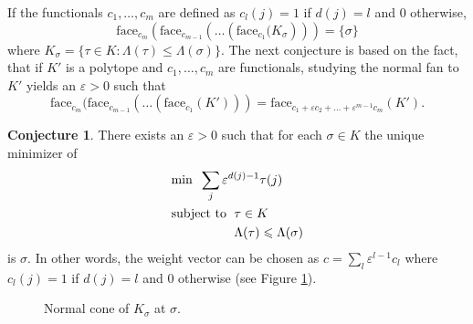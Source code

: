 \documentclass{article}
\theoremstyle{definition}
\newtheorem{conjecture}[theorem]{Conjecture}
\theoremstyle{remark}
\renewcommand{\leq}{\leqslant}
\renewcommand{\epsilon}{\varepsilon}
\newcommand{\face}{\text{face}}
\begin{document}
If the functionals $c_1,\dots,c_m$ are defined as $c_l(j)=1$ if $d(j)=l$ and $0$ otherwise,
$$ \face_{c_m}\left(\face_{c_{m-1}}\left(\dots \left(\face_{c_1}(K_\sigma\right)\right)\right) = \{\sigma\}$$
where $K_\sigma = \{\tau\in K : \Lambda(\tau)\leq\Lambda(\sigma)\}$.
The next conjecture is based on the fact, that if $K'$ is a polytope and $c_1,\dots,c_m$ are functionals, studying the normal fan to $K'$ yields an $\epsilon>0$ such that 
$$ \face_{c_m}(\face_{c_{m-1}}(\dots (\face_{c_1}(K'))) = \face_{c_1+\epsilon c_2 + \dots + \epsilon^{m-1}c_m}\left(K'\right).$$
\begin{conjecture}\label{cj:normalfan}
There exists an $\epsilon > 0$ such that for each $\sigma\in K$ the unique minimizer of 
\begin{align*}
&\textup{min}\;\; \sum_{j}\epsilon^{d(j)-1}\tau(j) \\
&\textup{subject to }\; \tau \in K \\
&\phantom{\textup{subject to }\;} \Lambda(\tau) \leq \Lambda(\sigma)
\end{align*}
is $\sigma$.
In other words, the weight vector can be chosen as $c = \sum_{l}\epsilon^{l-1} c_l$ where $c_l(j)=1$ if $d(j)=l$ and $0$ otherwise (see Figure \ref{fig:normalcone}).
\end{conjecture}

\begin{figure}[H]
\centering
{}
\caption{Normal cone of $K_\sigma$ at $\sigma$.}
\label{fig:normalcone}
\end{figure}
\end{document}
